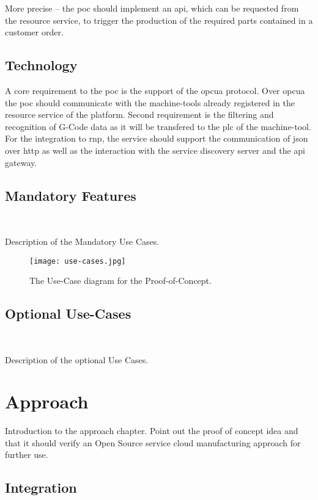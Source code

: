 \documentclass[
a4paper,
twoside,
headsepline,
cleardoublepage=empty,
parskip=half,
draft=false
]{scrbook}
\begin{document}
				More precise -- the \gls{poc} should implement an \gls{api}, which can be requested from the resource service, to trigger the production of the required parts contained in a customer order.
			
			\subsection{Technology} \label{subsec:technology}
			
				A core requirement to the \gls{poc} is the support of the \gls{opcua} protocol.
				Over \gls{opcua} the \gls{poc} should communicate with the machine-tools already registered in the resource service of the platform.
				Second requirement is the filtering and recognition of G-Code data as it will be transfered to the \gls{plc} of the machine-tool.
				For the integration to \gls{rnp}, the service should support the communication of \gls{json} over \gls{http} as well as the interaction with the service discovery server and the \gls{api} gateway.
			
			\subsection{Mandatory Features} \label{subsec:mandatory}
				
				Description of the Mandatory Use Cases.
				
				\begin{figure}[htbp]
					\centering
					\texttt{[image: use-cases.jpg]}
					\caption{The Use-Case diagram for the Proof-of-Concept.}
					\label{fig:use_cases}
				\end{figure}
				
			\subsection{Optional Use-Cases} \label{subsec:optional}	
				
				Description of the optional Use Cases.
				
		\section{Approach} \label{sec:approach}
		
			Introduction to the approach chapter. Point out the proof of concept idea and that it should verify an Open Source service cloud manufacturing approach for further use.
		
			\subsection{Integration} \label{subsec:integration}
			
\end{document}
